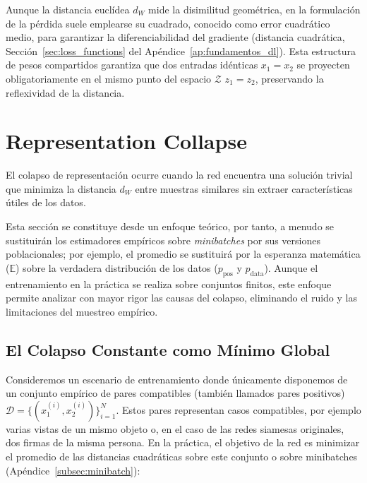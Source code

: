 Aunque la distancia euclídea $d_W$ mide la disimilitud geométrica, en la formulación de la pérdida suele emplearse su cuadrado, conocido como error cuadrático medio, para garantizar la diferenciabilidad del gradiente (distancia cuadrática, Sección~\ref{sec:loss_functions} del Apéndice~\ref{ap:fundamentos_dl}). Esta estructura de pesos compartidos garantiza que dos entradas idénticas $x_1 = x_2$ se proyecten obligatoriamente en el mismo punto del espacio $\mathcal{Z}$ $z_1 = z_2$, preservando la reflexividad de la distancia.

\section{Representation Collapse}
\label{sec:demostracion_colapso}

El colapso de representación ocurre cuando la red encuentra una solución trivial que minimiza la distancia $d_W$ entre muestras similares sin extraer características útiles de los datos.

\begin{remark}
\label{subsec:enfoque_probabilistico}
Esta sección se constituye desde un enfoque teórico, por tanto, a menudo se sustituirán los estimadores empíricos sobre \textit{minibatches} por sus versiones poblacionales; por ejemplo, el promedio se sustituirá por la esperanza matemática ($\mathbb{E}$) sobre la verdadera distribución de los datos ($p_{\text{pos}}$ y $p_{\text{data}}$). Aunque el entrenamiento en la práctica se realiza sobre conjuntos finitos, este enfoque permite analizar con mayor rigor las causas del colapso, eliminando el ruido y las limitaciones del muestreo empírico.
\end{remark}

\subsection{El Colapso Constante como Mínimo Global}
\label{subsec:colapso_constante}



Consideremos un escenario de entrenamiento donde únicamente disponemos de un conjunto empírico de pares compatibles (también llamados pares positivos) $\mathcal{D} = \{(x_1^{(i)}, x_2^{(i)})\}_{i=1}^N$. Estos pares representan casos compatibles, por ejemplo varias vistas de un mismo objeto o, en el caso de las redes siamesas originales, dos firmas de la misma persona. En la práctica, el objetivo de la red es minimizar el promedio de las distancias cuadráticas sobre este conjunto o sobre minibatches (Apéndice~\ref{subsec:minibatch}):

